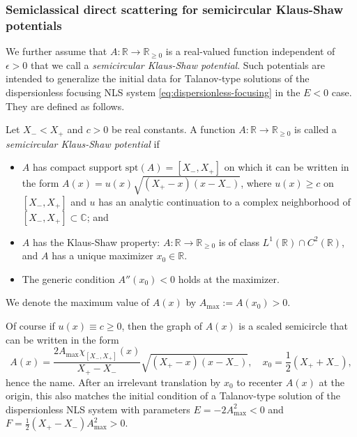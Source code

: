 \documentclass[12pt]{amsart}
\numberwithin{equation}{section}
\newcommand{\eps}{\epsilon}
\begin{document}
\subsubsection{Semiclassical direct scattering for semicircular Klaus-Shaw potentials}
\label{sec:semiclassical}
We further assume that $A:\mathbb{R}\to\mathbb{R}_{\ge 0}$ is a real-valued function independent of $\eps>0$ that we call a \emph{semicircular Klaus-Shaw potential}.  Such potentials are intended to generalize the initial data for Talanov-type solutions of the dispersionless focusing NLS system \eqref{eq:dispersionless-focusing} in the $E<0$ case.  They are defined as follows.
\begin{definition}
Let $X_-<X_+$ and $c>0$ be real constants.  A function $A:\mathbb{R}\to\mathbb{R}_{\ge 0}$ is called a \emph{semicircular Klaus-Shaw potential} if 
\begin{itemize}
\item
$A$ has compact support $\mathrm{spt}(A)=[X_-,X_+]$
on which it can be written in the form $A(x)=u(x)\sqrt{(X_+-x)(x-X_-)}$, where $u(x)\ge c$ on $[X_-,X_+]$ and $u$ has an analytic continuation to a complex neighborhood of $[X_-,X_+]\subset\mathbb{C}$; and
\item $A$ has the Klaus-Shaw property:  $A:\mathbb{R}\to\mathbb{R}_{\ge 0}$ is of class $L^1(\mathbb{R}) \cap C^2(\mathbb{R})$, and $A$ has a unique maximizer $x_0 \in \mathbb{R}$.
\item The generic condition $A''(x_0) < 0$ holds at the maximizer. 
\end{itemize}
We denote the maximum value of $A(x)$ by $A_\mathrm{max}:=A(x_0)>0$.
\label{def:semicircularKS}
\end{definition}
Of course if $u(x)\equiv c\ge 0$, then the graph of $A(x)$ is a scaled semicircle that can be written in the form
\begin{equation}
A(x)=\frac{2A_\mathrm{max}\chi_{[X_-,X_+]}(x)}{X_+-X_-}\sqrt{(X_+-x)(x-X_-)},\quad x_0=\frac{1}{2}(X_++X_-),
\label{eq:ExactSemicircle}
\end{equation}
hence the name.  After an irrelevant translation by $x_0$ to recenter $A(x)$ at the origin, this also matches the initial condition of a Talanov-type solution of the dispersionless NLS system with parameters $E=-2A_\mathrm{max}^2<0$ and $F=\frac{1}{2}(X_+-X_-)A_\mathrm{max}^2>0$.  
\end{document}

